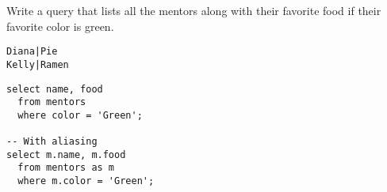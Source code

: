 \begin{blocksection}
\question Write a query that lists all the mentors along with their favorite food if their favorite color is green.

\begin{lstlisting}
Diana|Pie
Kelly|Ramen
\end{lstlisting}

\begin{solution}[1in]
\begin{lstlisting}
select name, food
  from mentors
  where color = 'Green';
  
-- With aliasing
select m.name, m.food
  from mentors as m
  where m.color = 'Green';
\end{lstlisting}
\end{solution}
\end{blocksection}
